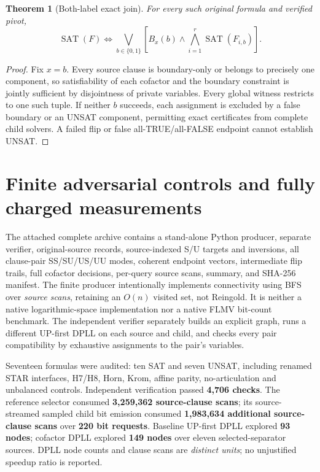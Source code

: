 \documentclass[11pt]{article}
\newtheorem{theorem}{Theorem}
\begin{document}
\begin{theorem}[Both-label exact join]
For every such original formula and verified pivot,
\[
\operatorname{SAT}(F)\iff
\bigvee_{b\in\{0,1\}}
\left[B_x(b)\land\bigwedge_{i=1}^r\operatorname{SAT}(F_{i,b})\right].
\]
\end{theorem}
\begin{proof}
Fix $x=b$. Every source clause is boundary-only or belongs to precisely one component, so satisfiability of each cofactor and the boundary constraint is jointly sufficient by disjointness of private variables. Every global witness restricts to one such tuple. If neither $b$ succeeds, each assignment is excluded by a false boundary or an UNSAT component, permitting exact certificates from complete child solvers. A failed flip or false all-TRUE/all-FALSE endpoint cannot establish UNSAT.
\end{proof}

\section{Finite adversarial controls and fully charged measurements}
The attached complete archive contains a stand-alone Python producer, separate verifier, original-source records, source-indexed S/U targets and inversions, all clause-pair SS/SU/US/UU modes, coherent endpoint vectors, intermediate flip trails, full cofactor decisions, per-query source scans, summary, and SHA-256 manifest. The finite producer intentionally implements connectivity using BFS over \emph{source scans}, retaining an $O(n)$ visited set, not Reingold. It is neither a native logarithmic-space implementation nor a native FLMV bit-count benchmark. The independent verifier separately builds an explicit graph, runs a different UP-first DPLL on each source and child, and checks every pair compatibility by exhaustive assignments to the pair's variables.

Seventeen formulas were audited: ten SAT and seven UNSAT, including renamed STAR interfaces, H7/H8, Horn, Krom, affine parity, no-articulation and unbalanced controls. Independent verification passed \textbf{4,706 checks}. The reference selector consumed \textbf{3,259,362 source-clause scans}; its source-streamed sampled child bit emission consumed \textbf{1,983,634 additional source-clause scans} over \textbf{220 bit requests}. Baseline UP-first DPLL explored \textbf{93 nodes}; cofactor DPLL explored \textbf{149 nodes} over eleven selected-separator sources. DPLL node counts and clause scans are \emph{distinct units}; no unjustified speedup ratio is reported.
\end{document}
